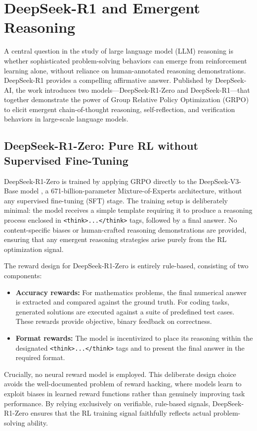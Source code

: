 \section{DeepSeek-R1 and Emergent Reasoning}
\label{sec:deepseek-r1}

A central question in the study of large language model (LLM) reasoning is whether
sophisticated problem-solving behaviors can emerge from reinforcement learning alone,
without reliance on human-annotated reasoning demonstrations. DeepSeek-R1
\cite{deepseek2025r1} provides a compelling affirmative answer. Published by
DeepSeek-AI, the work introduces two models---DeepSeek-R1-Zero and
DeepSeek-R1---that together demonstrate the power of Group Relative Policy
Optimization (GRPO) \cite{shao2024deepseekmath} to elicit emergent chain-of-thought
reasoning, self-reflection, and verification behaviors in large-scale language models.

\subsection{DeepSeek-R1-Zero: Pure RL without Supervised Fine-Tuning}

DeepSeek-R1-Zero is trained by applying GRPO directly to the DeepSeek-V3-Base
model \cite{deepseek2024v3}, a 671-billion-parameter Mixture-of-Experts architecture,
without any supervised fine-tuning (SFT) stage. The training setup is deliberately
minimal: the model receives a simple template requiring it to produce a reasoning
process enclosed in \texttt{<think>...</think>} tags, followed by a final answer. No
content-specific biases or human-crafted reasoning demonstrations are provided,
ensuring that any emergent reasoning strategies arise purely from the RL optimization
signal.

The reward design for DeepSeek-R1-Zero is entirely rule-based, consisting of two
components:
\begin{itemize}
    \item \textbf{Accuracy rewards:} For mathematics problems, the final numerical
    answer is extracted and compared against the ground truth. For coding tasks,
    generated solutions are executed against a suite of predefined test cases. These
    rewards provide objective, binary feedback on correctness.
    \item \textbf{Format rewards:} The model is incentivized to place its reasoning
    within the designated \texttt{<think>...</think>} tags and to present the final
    answer in the required format.
\end{itemize}
Crucially, no neural reward model is employed. This deliberate design choice avoids
the well-documented problem of reward hacking, where models learn to exploit biases
in learned reward functions rather than genuinely improving task performance. By
relying exclusively on verifiable, rule-based signals, DeepSeek-R1-Zero ensures that
the RL training signal faithfully reflects actual problem-solving ability.

